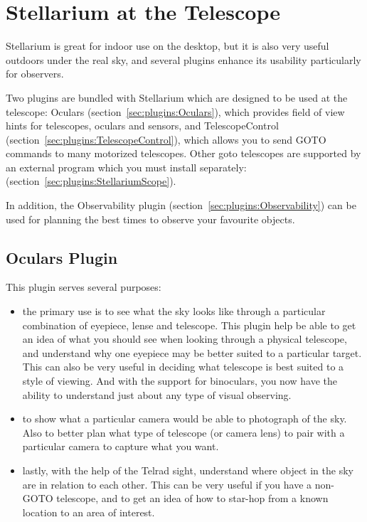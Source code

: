 \chapter{Stellarium at the Telescope}
\label{ch:atTheTelescope}

Stellarium is great for indoor use on the desktop, but it is also very
useful outdoors under the real sky, and several plugins enhance its
usability particularly for observers.

Two plugins are bundled with Stellarium which are designed to be used
at the telescope: Oculars (section~\ref{sec:plugins:Oculars}), which
provides field of view hints for telescopes, oculars and sensors, and
TelescopeControl (section~\ref{sec:plugins:TelescopeControl}), which
allows you to send GOTO commands to many motorized telescopes. Other
goto telescopes are supported by an external program which you must
install separately: 
(section~\ref{sec:plugins:StellariumScope}).

In addition, the Observability plugin (section~\ref{sec:plugins:Observability})
can be used for planning the best times to observe your favourite
objects.

\section{Oculars Plugin}
\label{sec:plugins:Oculars}

This plugin serves several purposes:
\begin{itemize}
\item the primary use is to see what the sky looks like through a particular combination of eyepiece, lense and telescope. This plugin help be able to get an idea of what you should see when looking through a physical telescope, and understand why one eyepiece may be better suited to a particular target. This can also be very useful in deciding what telescope is best suited to a style of viewing. And with the support for binoculars, you now have the ability to understand just about any type of visual observing.
\item to show what a particular camera would be able to photograph of the sky. Also to better plan what type of telescope (or camera lens) to pair with a particular camera to capture what you want.
\item lastly, with the help of the Telrad sight, understand where object in the sky are in relation to each other. This can be very useful if you have a non-GOTO telescope, and to get an idea of how to star-hop from a known location to an area of interest.
\end{itemize}

